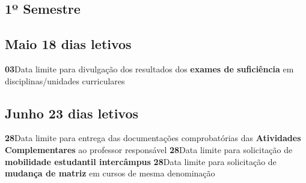\documentclass[thesis]{hmcposter}
\begin{document}
\begin{poster}
\section{\hfill \color{hmcorange}1º Semestre}
\subsection{Maio \hfill 18 dias letivos}\textbf{03}\qquad Data limite para divulgação dos resultados dos \textbf{exames de suficiência} em disciplinas/unidades curriculares \newline \null\subsection{Junho \hfill 23 dias letivos}\textbf{28}\qquad Data limite para entrega das documentações comprobatórias das \textbf{Atividades Complementares} ao professor responsável \newline \null\textbf{28}\qquad Data limite para solicitação de \textbf{mobilidade estudantil intercâmpus} \newline \null\textbf{28}\qquad Data limite para solicitação de \textbf{mudança de matriz} em cursos de mesma denominação \newline \null\newpage

\end{poster}
\end{document}
